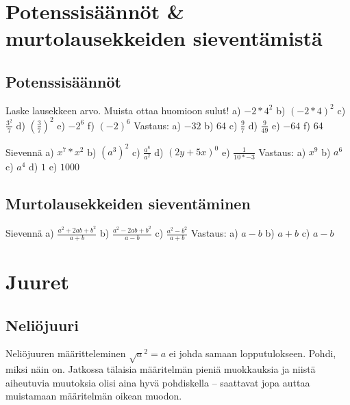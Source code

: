 \chapter{Potenssisäännöt \& murtolausekkeiden sieventämistä}

\section{Potenssisäännöt}

Laske lausekkeen arvo. Muista ottaa huomioon sulut!
a) $-2*4^2$
b) $(-2*4)^2$
c) $\frac{3^2}{7}$
d) $\left( \frac{3}{7} \right)^2$
e) $-2^6$
f) $(-2)^6$
Vastaus:
a) $-32$
b) 64
c) $\frac{9}{7}$
d) $\frac{9}{49}$
e) $-64$
f) 64

Sievennä
a) $x^7*x^2$
b) $(a^3)^2$
c) $\frac{a^8}{a^2}$
d) $(2y+5x)^0$
e) $\frac{1}{10*{-3}}$
Vastaus:
a) $x^9$
b) $a^6$
c) $a^4$
d) $1$
e) $1000$

\section{Murtolausekkeiden sieventäminen}

Sievennä
a) $\frac{a^2+2ab+b^2}{a+b}$
b) $\frac{a^2-2ab+b^2}{a-b}$
c) $\frac{a^2-b^2}{a+b}$
Vastaus:
a) $a-b$
b) $a+b$
c) $a-b$

\chapter{Juuret}

\section{Neliöjuuri}


Neliöjuuren määritteleminen $\sqrt{a}^2=a$ ei johda samaan lopputulokseen. Pohdi, miksi näin on.
Jatkossa tälaisia määritelmän pieniä muokkauksia ja niistä aiheutuvia muutoksia olisi aina hyvä pohdiskella -- saattavat jopa auttaa muistamaan määritelmän oikean muodon.

